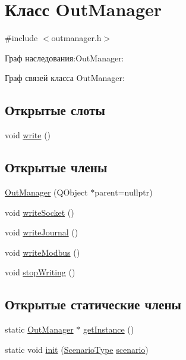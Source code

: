 \hypertarget{class_out_manager}{}\section{Класс Out\+Manager}
\label{class_out_manager}


{\ttfamily \#include $<$outmanager.\+h$>$}



Граф наследования\+:Out\+Manager\+:


Граф связей класса Out\+Manager\+:
\subsection*{Открытые слоты}
\begin{DoxyCompactItemize}
\item 
void \hyperlink{class_out_manager_a04f085f9812ba6d105a8d13344f1ba8f}{write} ()
\end{DoxyCompactItemize}
\subsection*{Открытые члены}
\begin{DoxyCompactItemize}
\item 
\hyperlink{class_out_manager_ab33060397abec259ec6579469aef1c8e}{Out\+Manager} (Q\+Object $\ast$parent=nullptr)
\item 
void \hyperlink{class_out_manager_a754a7835198dacb9a0dffcc772cdd454}{write\+Socket} ()
\item 
void \hyperlink{class_out_manager_a72350f29d5beb0ddcbf14071b4d609a8}{write\+Journal} ()
\item 
void \hyperlink{class_out_manager_aa04ed17d925a73577e08152120e50339}{write\+Modbus} ()
\item 
void \hyperlink{class_out_manager_a58e0db7547fda26579600c443abc7af4}{stop\+Writing} ()
\end{DoxyCompactItemize}
\subsection*{Открытые статические члены}
\begin{DoxyCompactItemize}
\item 
static \hyperlink{class_out_manager}{Out\+Manager} $\ast$ \hyperlink{class_out_manager_a25e2f6c90af51feae79e8233d9e746cd}{get\+Instance} ()
\item 
static void \hyperlink{class_out_manager_ab7c61a46bbb2cf29731a408ab5eb2b83}{init} (\hyperlink{_random_types_8h_ae8f073eec97d33cf9783ecbe50531dfd}{Scenario\+Type} \hyperlink{class_out_manager_ae9c258658580c48791cff6e5c3ad62af}{scenario})
\end{DoxyCompactItemize}

